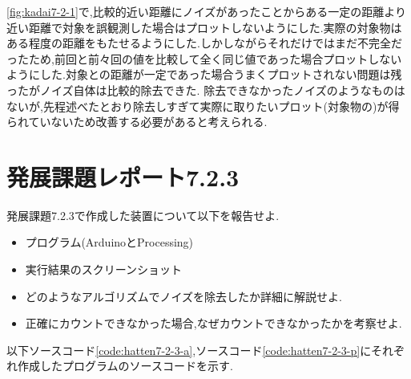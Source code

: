\documentclass{jarticle}
\begin{document}
\ref{fig:kadai7-2-1}で,比較的近い距離にノイズがあったことからある一定の距離より近い距離で対象を誤観測した場合はプロットしないようにした.実際の対象物はある程度の距離をもたせるようにした.しかしながらそれだけではまだ不完全だったため,前回と前々回の値を比較して全く同じ値であった場合プロットしないようにした.対象との距離が一定であった場合うまくプロットされない問題は残ったがノイズ自体は比較的除去できた.
除去できなかったノイズのようなものはないが,先程述べたとおり除去しすぎて実際に取りたいプロット(対象物の)が得られていないため改善する必要があると考えられる.
\section{発展課題レポート7.2.3}
発展課題7.2.3で作成した装置について以下を報告せよ.
\begin{itemize}
\item プログラム(ArduinoとProcessing)
\item 実行結果のスクリーンショット
\item どのようなアルゴリズムでノイズを除去したか詳細に解説せよ.
\item 正確にカウントできなかった場合,なぜカウントできなかったかを考察せよ.
\end{itemize}


以下ソースコード\ref{code:hatten7-2-3-a},ソースコード\ref{code:hatten7-2-3-p}にそれぞれ作成したプログラムのソースコードを示す.
\end{document}
